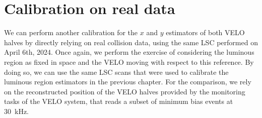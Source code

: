 \section{Calibration on real data}


We can perform another calibration for the $x$ and $y$ estimators of both VELO halves by directly relying on real collision data, using the same LSC performed on April 6th, 2024. 
Once again, we perform the exercise of considering the luminous region as fixed in space and the VELO moving with respect to this reference. By doing so, we can use the same LSC scans that were used to calibrate the luminous region estimators in the previous chapter. For the comparison, we rely on the reconstructed position of the VELO halves provided by the monitoring tasks of the VELO system, that reads a subset of minimum bias events at \SI{30}{\kilo\hertz}. 


